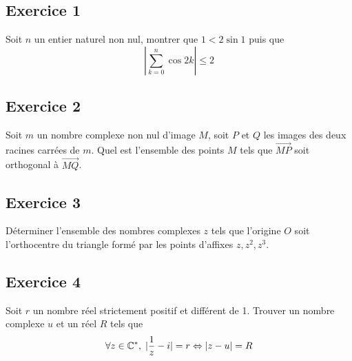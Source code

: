 \subsection*{Exercice 1}  Soit $n$ un entier naturel non nul, montrer que $1 < 2\sin 1$ puis que 
\begin{displaymath}
 \left| \sum_{k=0}^{n}\cos 2k\right| \leq 2
\end{displaymath}


\subsection*{Exercice 2} Soit $m$ un nombre complexe non nul d'image $M$, soit $P$ et $Q$ les images des deux racines carr{\'e}es de $m$. Quel est l'ensemble des points $M$ tels que $\overrightarrow{MP}$ soit orthogonal {\`a} $\overrightarrow{MQ}$.

\subsection*{Exercice 3} D{\'e}terminer l'ensemble des nombres complexes $z$ tels que l'origine $O$ soit l'orthocentre du triangle form{\'e} par les points d'affixes $z,z^2,z^3$.

\subsection*{Exercice 4}
Soit $r$ un nombre r{\'e}el strictement positif et diff{\'e}rent de 1. Trouver un nombre complexe $u$ et un r{\'e}el $R$ tels que
\begin{displaymath}
 \forall z \in \mathbb{C}^*,\; |\frac{1}{z}-i|=r\Leftrightarrow|z-u|=R
\end{displaymath}
